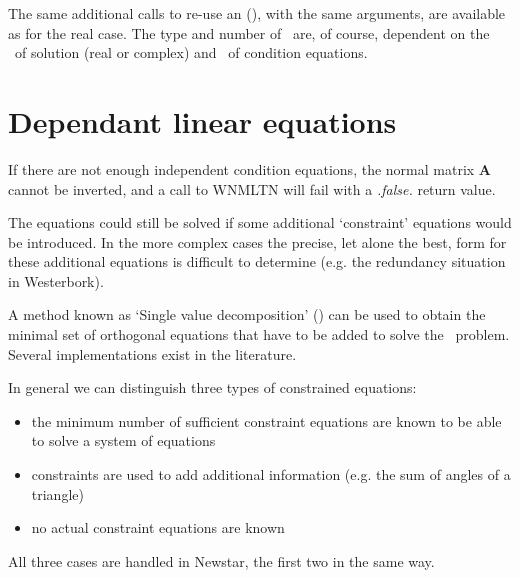 The same additional calls to re-use an (),
with the same arguments,
are available as for the real case. The type and number of \Cond\ are, of
course, dependent on the \Type\ of solution (real or complex) and \Type\ of
condition equations.

\section{Dependant linear equations}

If there are not enough independent condition equations, the normal matrix
$\mathbf{A}$ cannot be inverted, and a call to WNMLTN will fail with a {\em
.false.} return value.

The equations could still be solved if some additional `constraint' equations
would be introduced. In the more complex cases the precise, let alone the
best, form for these additional equations is difficult to determine (e.g. the
redundancy situation in Westerbork).

A method known as `Single value decomposition' (\SVD) can be used to obtain
the minimal set of orthogonal equations that have to be added to solve the
\LSQ\ problem. Several implementations exist in the literature.

In general we can distinguish three types of constrained equations:
\begin{itemize}
	\item the minimum number of sufficient constraint equations are known
to be able to solve a system of equations \Mn
	\item constraints are used to add additional information (e.g. the
sum of angles of a triangle) \Mn
	\item no actual constraint equations are known \Mn
\end{itemize}
All three cases are handled in Newstar, the first two in the same way.

